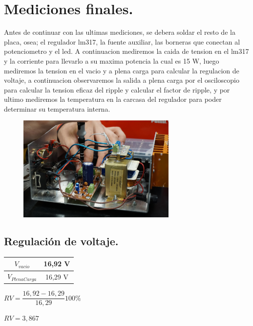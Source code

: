 \section{Mediciones finales.}

Antes de continuar con las ultimas mediciones, se debera soldar el resto de la placa, osea; el regulador lm317, la fuente auxiliar, las borneras que conectan al potenciometro y el led. A continuacion mediremos la caida de tension en el lm317 y la corriente para llevarlo a su maxima potencia la cual es 15 W, luego mediremos la tension en el vacio y a plena carga para calcular la regulacion de voltaje, a continuacion observaremos la salida a plena carga por el osciloscopio para calcular la tension eficaz del ripple y calcular el factor de ripple, y por ultimo mediremos la temperatura en la carcasa del regulador para poder determinar su temperatura interna.  \\

\begin{figure}[h]
  \centering
  \includegraphics[width=0.70\textwidth]{images/placaMontada.png}
\end{figure}

\subsection{Regulación de voltaje.}

\begin{table}[H]
  \centering
  \begin{tabular}{|c|c|}
    \hline
    $V_{vacio}$ & 16,92 V \\ \hline
    $V_{PlenaCarga}$ & 16,29 V \\ \hline
  \end{tabular}
\end{table}

$RV = \dfrac{16,92 - 16,29}{16,29} 100\percent$

$RV = 3,867 $

